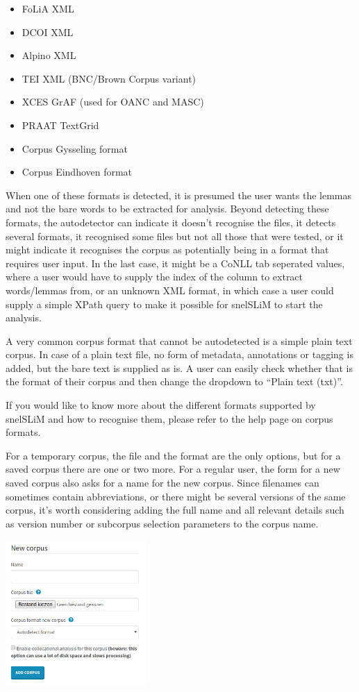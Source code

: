 \documentclass[11pt,a4paper]{article}
\begin{document}
\begin{itemize}
    \item FoLiA XML
    \item DCOI XML
    \item Alpino XML
    \item TEI XML (BNC/Brown Corpus variant)
    \item XCES GrAF (used for OANC and MASC)
    \item PRAAT TextGrid
    \item Corpus Gysseling format
    \item Corpus Eindhoven format
\end{itemize}

When one of these formats is detected, it is presumed the user wants the lemmas and not the bare words to be extracted for analysis. Beyond detecting these formats, the autodetector can indicate it doesn't recognise the files, it detects several formats, it recognised some files but not all those that were tested, or it might indicate it recognises the corpus as potentially being in a format that requires user input. In the last case, it might be a CoNLL tab seperated values, where a user would have to supply the index of the column to extract words/lemmas from, or an unknown XML format, in which case a user could supply a simple XPath query to make it possible for snelSLiM to start the analysis.

A very common corpus format that cannot be autodetected is a simple plain text corpus. In case of a plain text file, no form of metadata, annotations or tagging is added, but the bare text is supplied as is. A user can easily check whether that is the format of their corpus and then change the dropdown to ``Plain text (txt)''. 

If you would like to know more about the different formats supported by snelSLiM and how to recognise them, please refer to the help page on corpus formats.

For a temporary corpus, the file and the format are the only options, but for a saved corpus there are one or two more. For a regular user, the form for a new saved corpus also asks for a name for the new corpus. Since filenames can sometimes contain abbreviations, or there might be several versions of the same corpus, it's worth considering adding the full name and all relevant details such as version number or subcorpus selection parameters to the corpus name.

\centerline{\includegraphics[width=0.4\textwidth]{images/uploadmycorpora.png}}
\end{document}
